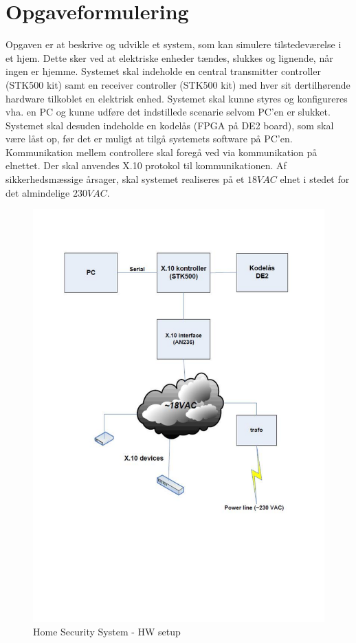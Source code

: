 \chapter{Opgaveformulering}
Opgaven er at beskrive og udvikle et system, som kan simulere tilstedeværelse i et hjem. 
Dette sker ved at elektriske enheder tændes, slukkes og lignende, når ingen er hjemme. 
Systemet skal indeholde en central transmitter controller (STK500 kit) samt en receiver controller (STK500 kit) med hver sit dertilhørende hardware tilkoblet en elektrisk enhed.
Systemet skal kunne styres og konfigureres vha. en PC og kunne udføre det indstillede scenarie selvom PC’en er slukket. 
Systemet skal desuden indeholde en kodelås (FPGA på DE2 board), som skal være låst op, før det er muligt at tilgå systemets software på PC'en.
Kommunikation mellem controllere skal foregå ved via kommunikation på elnettet. 
Der skal anvendes X.10 protokol\cite[s.12]{lib:AN236} til kommunikationen.
Af sikkerhedsmæssige årsager, skal systemet realiseres på et $18 VAC$ elnet i stedet for det almindelige $230 VAC$. 
\begin{figure}[h]
\centering 
\includegraphics[width={\textwidth-2cm}, trim=0 220 0 50, clip=true] {Opgaveformulering/HW_setup.pdf}
\caption{Home Security System - HW setup \cite[s. 2]{lib:Projektoplaeg}}
\end{figure}

\clearpage